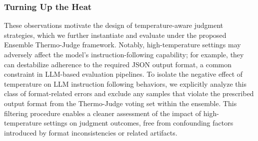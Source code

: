 \documentclass[11pt]{article}
\begin{document}
\subsubsection{Turning Up the Heat}

These observations motivate the design of temperature-aware judgment strategies, which we further instantiate and evaluate under the proposed Ensemble Thermo-Judge framework. Notably, high-temperature settings may adversely affect the model’s instruction-following capability; for example, they can destabilize adherence to the required JSON output format, a common constraint in LLM-based evaluation pipelines. To isolate the negative effect of temperature on LLM instruction following behaviors, we explicitly analyze this class of format-related errors and exclude any samples that violate the prescribed output format from the Thermo-Judge voting set within the ensemble. This filtering procedure enables a cleaner assessment of the impact of high-temperature settings on judgment outcomes, free from confounding factors introduced by format inconsistencies or related artifacts.
\end{document}
